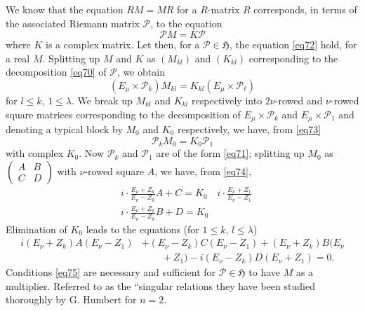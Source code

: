 We know that the equation $RM=MR$ for a $R$-matrix $R$ corresponds,
in terms of the associated Riemann matrix $\mathscr{P}$, to the
equation
\begin{equation*}
\mathscr{P}M=K\mathscr{P}\tag{72}\label{eq72}
\end{equation*}
where $K$ is a complex matrix. Let then, for a
$\mathscr{P}\in\mathfrak{H}$, the equation \eqref{eq72} hold, for a real
$M$. Splitting up $M$ and $K$ as $(M_{kl})$ and $(K_{kl})$
corresponding to the decomposition \eqref{eq70} of $\mathscr{P}$, we
obtain
\begin{equation*}
(E_{\mu}\times \mathscr{P}_{k})M_{kl}=K_{kl}(E_{\mu}\times
  \mathscr{P}_{\ell})\tag{73}\label{eq73} 
\end{equation*}
for $l\leq k$, $1\leq \lambda$. We break up $M_{kl}$ and $K_{kl}$
respectively into $2\nu$-rowed and $\nu$-rowed square matrices
corresponding to the decomposition of $E_{\mu}\times\mathscr{P}_{k}$
and $E_{\mu}\times\mathscr{P}_{1}$ and denoting a typical block by
$M_{0}$ and $K_{0}$ respectively, we have, from \eqref{eq73}
\begin{equation*}
\mathscr{P}_{k}M_{0}=K_{0}\mathscr{P}_{1}\tag{74}\label{eq74}
\end{equation*}
with complex $K_{0}$. Now $\mathscr{P}_{k}$ and $\mathscr{P}_{1}$ are
of the form \eqref{eq71}; splitting up $M_{0}$ as
$\left(\begin{smallmatrix} A & B\\ C & D
\end{smallmatrix}\right)$ with $\nu$-rowed square $A$, we have, from
\eqref{eq74}, 
\begin{align*}
& i\cdot \frac{E_{\nu}+Z_{k}}{E_{\nu}-Z_{k}}A+C=K_{0}\quad i\cdot
  \frac{E_{\nu}+Z_{1}}{E_{\nu}-Z_{1}}\\ 
& i\cdot \frac{E_{\nu}+Z_{k}}{E_{\nu}-Z_{k}}B+D=K_{0}
\end{align*}
Elimination of $K_{0}$ leads to the equations (for $1\leq k$, $l\leq
\lambda$)
\begin{align*}
i(E_{\nu}+Z_{k})A(E_{\nu}-Z_{1})&+(E_{\nu}-Z_{k})C(E_{\nu}-Z_{1})+
(E_{\nu}+Z_{k})B(E_{\nu}\\
&\qquad{}+Z_{1})-i(E_{\nu}-Z_{k})D(E_{\nu}+Z_{1})=0.\tag{75}\label{eq75} 
\end{align*}
Conditions \eqref{eq75} are necessary and sufficient for
$\mathscr{P}\in\mathfrak{H}$ to have $M$ as a multiplier. Referred to
as the ``singular relations they have been studied thoroughly by G.\@
Humbert \cite{10} for $n=2$.

